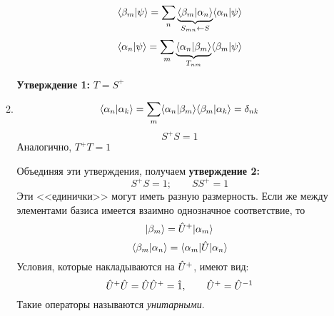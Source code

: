 \begin{itemize}
\begin{enumerate}
$$
    \langle \beta_m | \psi \rangle = \sum_n \underbrace{\langle \beta_m | \alpha_n \rangle}_{S_{mn} \leftarrow S} \langle \alpha_n | \psi \rangle
$$
$$
    \langle \alpha_n | \psi \rangle = \sum_m \underbrace{\langle \alpha_n | \beta_m \rangle}_{T_{nm}} \langle \beta_m | \psi \rangle
$$

\textbf{Утверждение 1:} $T = S^{+}$
  \item
$$
    \langle \alpha_n | \alpha_k \rangle = \sum_m \langle \alpha_n | \beta_m \rangle \langle \beta_m | \alpha_k \rangle = \delta_{nk}
$$
$$
    S^+ S = 1
$$
Аналогично, $T^+ T = 1$

Объединяя эти утверждения, получаем \textbf{утверждение 2:}
$$
    S^+S = 1; \qquad SS^+ = 1
$$
\Rem Эти <<единички>> могут иметь разную размерность. Если же между элементами базиса имеется взаимно однозначное соответствие, то
$$
    | \beta_m \rangle = \Hat U^+ | \alpha_m \rangle
$$
$$
    \langle \beta_m | \alpha_n \rangle = { \langle \alpha_m |\Hat U| \alpha_n \rangle }
$$
Условия, которые накладываются на $\Hat U^+$, имеют вид:
$$
    \Hat U^+ \Hat U = \Hat U \hat U^+ = \Hat 1, \qquad \Hat U^+ = \Hat U^{-1}
$$
\Def Такие операторы называются \emph{унитарными}.
\end{enumerate}
\end{itemize}

